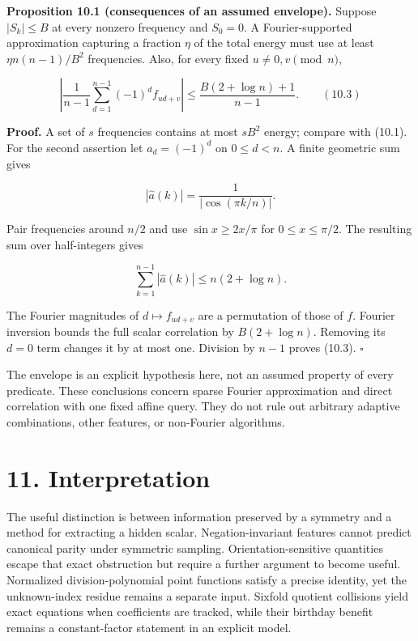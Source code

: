 \documentclass[
  11pt,
  a4paper,
]{article}
\begin{document}
\textbf{Proposition 10.1 (consequences of an assumed envelope).} Suppose
\(|S_k|\leq B\) at every nonzero frequency and \(S_0=0\). A
Fourier-supported approximation capturing a fraction \(\eta\) of the
total energy must use at least \(\eta n(n-1)/B^2\) frequencies. Also,
for every fixed \(u\neq0,v\pmod n\),

\[
\left|\frac1{n-1}\sum_{d=1}^{n-1}(-1)^d f_{ud+v}\right|
\leq\frac{B(2+\log n)+1}{n-1}. \qquad (10.3)
\]

\textbf{Proof.} A set of \(s\) frequencies contains at most \(sB^2\)
energy; compare with (10.1). For the second assertion let \(a_d=(-1)^d\)
on \(0\leq d<n\). A finite geometric sum gives

\[
|\widehat a(k)|=\frac1{|\cos(\pi k/n)|}.
\]

Pair frequencies around \(n/2\) and use \(\sin x\geq2x/\pi\) for
\(0\leq x\leq\pi/2\). The resulting sum over half-integers gives

\[
\sum_{k=1}^{n-1}|\widehat a(k)|\leq n(2+\log n).
\]

The Fourier magnitudes of \(d\mapsto f_{ud+v}\) are a permutation of
those of \(f\). Fourier inversion bounds the full scalar correlation by
\(B(2+\log n)\). Removing its \(d=0\) term changes it by at most one.
Division by \(n-1\) proves (10.3). \(\square\)

The envelope is an explicit hypothesis here, not an assumed property of
every predicate. These conclusions concern sparse Fourier approximation
and direct correlation with one fixed affine query. They do not rule out
arbitrary adaptive combinations, other features, or non-Fourier
algorithms.

\section{11. Interpretation}\label{interpretation}

The useful distinction is between information preserved by a symmetry
and a method for extracting a hidden scalar. Negation-invariant features
cannot predict canonical parity under symmetric sampling.
Orientation-sensitive quantities escape that exact obstruction but
require a further argument to become useful. Normalized
division-polynomial point functions satisfy a precise identity, yet the
unknown-index residue remains a separate input. Sixfold quotient
collisions yield exact equations when coefficients are tracked, while
their birthday benefit remains a constant-factor statement in an
explicit model.
\end{document}
